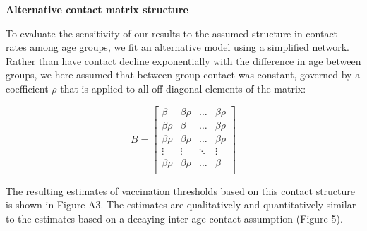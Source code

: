 \textbf{Alternative contact matrix structure}

To evaluate the sensitivity of our results to the assumed structure in contact rates among age groups, we fit an alternative model using a simplified network. Rather than have contact decline exponentially with the difference in age between groups, we here assumed that between-group contact was constant, governed by a coefficient $\rho$ that is applied to all off-diagonal elements of the matrix:

\begin{equation}
B = \left[{
\begin{array}{cccc}
  {\beta} & {\beta \rho} & \ldots &  {\beta \rho}  \\
  {\beta \rho} & {\beta} & \ldots &  {\beta \rho} \\
{\beta \rho} & {\beta \rho} & \ldots & {\beta \rho}  \\
  \vdots & \vdots & \ddots  & \vdots \\
  {\beta \rho} & {\beta \rho} & \ldots & {\beta}  \\
\end{array}
}\right]
\end{equation}

The resulting estimates of vaccination thresholds based on this contact structure is shown in Figure A3. The estimates are qualitatively and quantitatively similar to the estimates based on a decaying inter-age contact assumption (Figure 5).